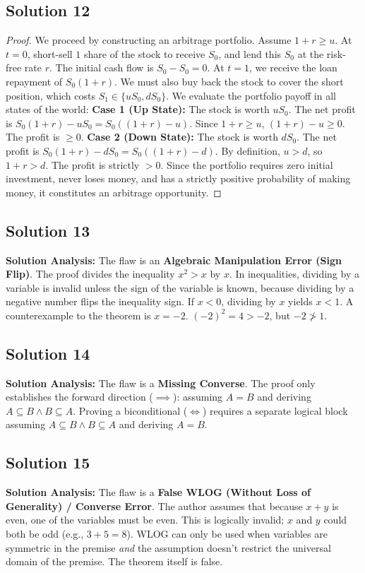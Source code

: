 \documentclass[11pt]{article}
\begin{document}
\subsection{Solution 12}
\begin{proof}
We proceed by constructing an arbitrage portfolio. Assume $1+r \ge u$.
At $t=0$, short-sell $1$ share of the stock to receive $S_0$, and lend this $S_0$ at the risk-free rate $r$. The initial cash flow is $S_0 - S_0 = 0$.
At $t=1$, we receive the loan repayment of $S_0(1+r)$. We must also buy back the stock to cover the short position, which costs $S_1 \in \{uS_0, dS_0\}$.
We evaluate the portfolio payoff in all states of the world:
\textbf{Case 1 (Up State):} The stock is worth $uS_0$. The net profit is $S_0(1+r) - uS_0 = S_0((1+r) - u)$. Since $1+r \ge u$, $(1+r) - u \ge 0$. The profit is $\ge 0$.
\textbf{Case 2 (Down State):} The stock is worth $dS_0$. The net profit is $S_0(1+r) - dS_0 = S_0((1+r) - d)$. By definition, $u > d$, so $1+r > d$. The profit is strictly $> 0$.
Since the portfolio requires zero initial investment, never loses money, and has a strictly positive probability of making money, it constitutes an arbitrage opportunity.
\end{proof}

\subsection{Solution 13}
\textbf{Solution Analysis:} The flaw is an \textbf{Algebraic Manipulation Error (Sign Flip)}. The proof divides the inequality $x^2 > x$ by $x$. In inequalities, dividing by a variable is invalid unless the sign of the variable is known, because dividing by a negative number flips the inequality sign. If $x < 0$, dividing by $x$ yields $x < 1$. A counterexample to the theorem is $x = -2$. $(-2)^2 = 4 > -2$, but $-2 \not> 1$.

\subsection{Solution 14}
\textbf{Solution Analysis:} The flaw is a \textbf{Missing Converse}. The proof only establishes the forward direction ($\implies$): assuming $A = B$ and deriving $A \subseteq B \land B \subseteq A$. Proving a biconditional ($\iff$) requires a separate logical block assuming $A \subseteq B \land B \subseteq A$ and deriving $A = B$.

\subsection{Solution 15}
\textbf{Solution Analysis:} The flaw is a \textbf{False WLOG (Without Loss of Generality) / Converse Error}. The author assumes that because $x+y$ is even, one of the variables must be even. This is logically invalid; $x$ and $y$ could both be odd (e.g., $3+5 = 8$). WLOG can only be used when variables are symmetric in the premise \textit{and} the assumption doesn't restrict the universal domain of the premise. The theorem itself is false.
\end{document}
